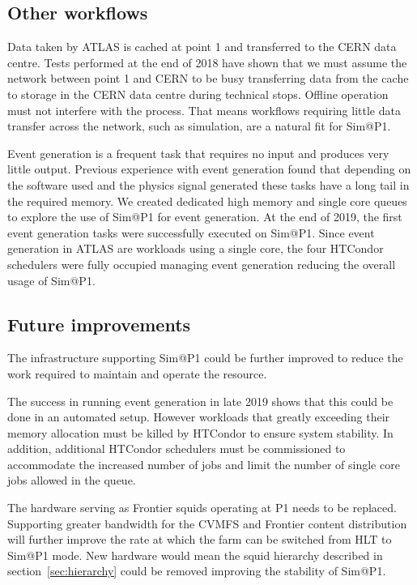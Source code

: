\documentclass{webofc}
\begin{document}
\subsection{Other workflows}
\label{sec:evgen}
Data taken by ATLAS is cached at point 1 and transferred to the CERN data
centre. Tests performed at the end of
2018 have shown that we must assume the network between point 1 and CERN to be
busy transferring data from the cache to storage in the CERN data centre
during technical stops. Offline operation must not interfere with the process.
That means workflows requiring little data transfer across the network, such as
simulation, are a natural fit for Sim@P1.

Event generation is a frequent task that requires no input and produces very
little output. Previous experience with event generation found that depending on
the software used and the physics signal generated these tasks have a long tail
in the required memory. We created dedicated high memory and single core queues
to explore the use of Sim@P1 for event generation. At the end of 2019, the first
event generation tasks
were successfully executed on Sim@P1. Since event generation
in ATLAS are workloads using a single core, the four HTCondor schedulers were
fully occupied managing event generation reducing the overall usage of Sim@P1.

\subsection{Future improvements}
The infrastructure supporting Sim@P1 could be further improved to reduce the
work required to maintain and operate the resource.

The success in running event generation in late 2019 shows that this could be
done in an automated setup. However workloads that greatly exceeding their
memory
allocation must be killed by HTCondor to ensure system stability. In addition,
additional HTCondor schedulers must be commissioned to accommodate the increased
number of jobs and limit the number of single core jobs allowed in the queue.

The hardware serving as Frontier squids operating at P1 needs to be replaced.
Supporting greater bandwidth for the CVMFS and Frontier content distribution
will further improve the rate at which the farm can be switched from HLT to
Sim@P1 mode. New hardware would mean the squid hierarchy described
in section~\ref{sec:hierarchy} could be removed improving the stability of
Sim@P1.
\end{document}
